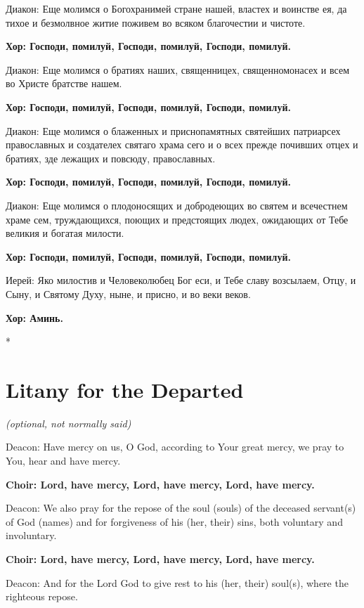 \documentclass[12pt,a4paper,titlepage]{report}
\begin{document}
\begin{paracol}[1]{2}
	Диакон: Еще молимся о Богохранимей стране нашей, властех и воинстве ея, да тихое и безмолвное житие поживем во всяком благочестии и чистоте.
	
	\textbf{Хор: Господи, помилуй, Господи, помилуй, Господи, помилуй.}
	
	Диакон: Еще молимся о братиях наших, священницех, священномонасех и всем во Христе братстве нашем.
	
	\textbf{Хор: Господи, помилуй, Господи, помилуй, Господи, помилуй.}
	
	Диакон: Еще молимся о блаженных и приснопамятных святейших патриарсех православных и создателех святаго храма сего  и о всех прежде почивших отцех и братиях, зде лежащих и повсюду, православных.
	
	\textbf{Хор: Господи, помилуй, Господи, помилуй, Господи, помилуй.}
	
	Диакон: Еще молимся о плодоносящих и добродеющих во святем и всечестнем храме сем, труждающихся, поющих и предстоящих людех, ожидающих от Тебе великия и богатая милости.
	
	\textbf{Хор: Господи, помилуй, Господи, помилуй, Господи, помилуй.}
	
	Иерей: Яко милостив и Человеколюбец Бог еси, и Тебе славу возсылаем, Отцу, и Сыну, и Святому Духу, ныне, и присно, и во веки веков.
	
	\textbf{Хор: Аминь.}
	
	\switchcolumn[0]*
	
	\section*{Litany for the Departed}
	
	\indent \textit {(optional, not normally said)}
	
	Deacon: Have mercy on us, O God, according to Your great mercy, we pray to You, hear and have mercy.
	
	\textbf{Choir: Lord, have mercy, Lord, have mercy, Lord, have mercy.}
	
	Deacon: We also pray for the repose of the soul (souls) of the deceased servant(s) of God (names) and for forgiveness of his (her, their) sins, both voluntary and involuntary.
	
	\textbf{Choir: Lord, have mercy, Lord, have mercy, Lord, have mercy.}
	
	Deacon: And for the Lord God to give rest to his (her, their) soul(s), where the righteous repose.
	

\end{paracol}
\end{document}
